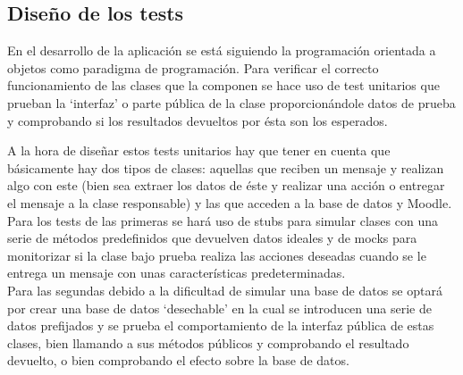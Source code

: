 \subsection{Diseño de los tests}

En el desarrollo de la aplicación se está siguiendo la programación orientada a objetos como paradigma de programación. Para verificar el correcto funcionamiento de las clases que la componen se hace uso de test unitarios que prueban la \enquote*{interfaz} o parte pública de la clase proporcionándole datos de prueba y comprobando si los resultados devueltos por ésta son los esperados.
\par
A la hora de diseñar estos tests unitarios hay que tener en cuenta que básicamente hay dos tipos de clases: aquellas que reciben un mensaje y realizan algo con este (bien sea extraer los datos de éste y realizar una acción o entregar el mensaje a la clase responsable) y las que acceden a la base de datos y Moodle. Para los tests de las primeras se hará uso de stubs para simular clases con una serie de métodos predefinidos que devuelven datos ideales y  de mocks para monitorizar si la clase bajo prueba realiza las acciones deseadas cuando se le entrega un mensaje con unas características predeterminadas.\\
Para las segundas debido a la dificultad de simular una base de datos se optará por crear una base de datos \enquote*{desechable} en la cual se introducen una serie de datos prefijados y se prueba el comportamiento de la interfaz pública de estas clases, bien llamando a sus métodos públicos y comprobando el resultado devuelto, o bien comprobando el efecto sobre la base de datos.
